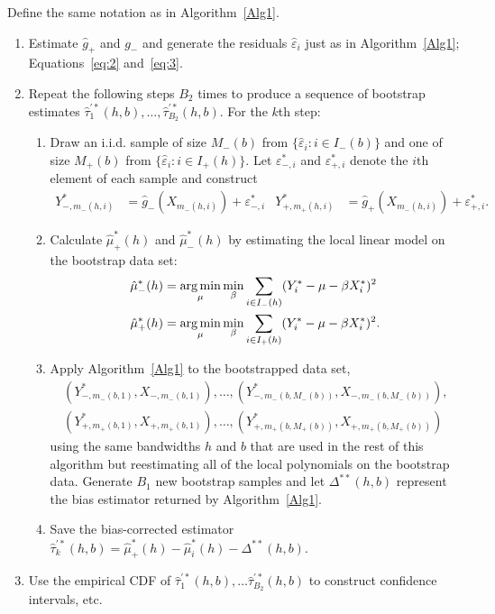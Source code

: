 \documentclass[12pt,fleqn]{article}
\begin{document}
\begin{algorithm}\label{Alg2}
  Define the same notation as in Algorithm~\ref{Alg1}.
  \begin{enumerate}
  \item Estimate $\hat g_+$ and $g_-$ and generate the residuals
    $\hat\varepsilon_i$ just as in Algorithm~\ref{Alg1}; Equations~\eqref{eq:2}
    and~\eqref{eq:3}.
  \item Repeat the following steps $B_{2}$ times to produce a sequence of
    bootstrap estimates
    $\hat\tau_1^{\prime*}(h,b), \dots, \hat\tau_{B_{2}}^{\prime*}(h,b)$. For the
    $k$th step:
    \begin{enumerate}
    \item Draw an i.i.d. sample of size $M_-(b)$ from
      $\{\hat\varepsilon_i : i \in I_-(b)\}$ and one of size $M_+(b)$ from
      $\{\hat\varepsilon_i : i \in I_+(h)\}$. Let $\varepsilon_{-,i}^{*}$ and
      $\varepsilon_{+,i}^{*}$ denote the $i$th element of each sample and
      construct
      \begin{align*}
        Y_{-,m_-(h,i)}^* &= \hat g_-(X_{m_-(h,i)}) + \varepsilon_{-,i}^{*} &
        Y_{+,m_+(h,i)}^* &= \hat g_+(X_{m_-(h,i)}) + \varepsilon_{+,i}^{*}.
      \end{align*}
    \item Calculate $\hat\mu_+^*(h)$ and $\hat\mu_-^*(h)$ by estimating the
      local linear model on the bootstrap data set:
      \begin{align*}
        \hat\mu_-^*(h)
        &= \argmin_{\mu} \min_{\beta} \ssum[-]{i}{h}
          (Y_i^* - \mu - \beta X_i^*)^2 \\
        \hat\mu_+^*(h)
        &= \argmin_{\mu} \min_{\beta} \ssum[+]{i}{h}
          (Y_i^* - \mu - \beta X_i^*)^2.
      \end{align*}
    \item Apply Algorithm~\ref{Alg1} to the bootstrapped data set,
      \begin{multline*}
        (Y_{-,m_-(b,1)}^{*}, X_{-,m_-(b,1)}),\dots,
        (Y_{-,m_-(b,M_-(b))}^{*},X_{-,m_-(b,M_-(b))}), \\
        (Y_{+,m_+(b,1)}^{*}, X_{+,m_+(b,1)}),\dots,
        (Y_{+,m_+(b,M_+(b))}^{*},X_{+,m_+(b,M_+(b))})
      \end{multline*}
      using the same bandwidths $h$ and $b$ that are used in the rest of this
      algorithm but reestimating all of the local polynomials on the bootstrap
      data. Generate $B_1$ new bootstrap samples and let $\Delta^{**}(h,b)$
      represent the bias estimator returned by Algorithm~\ref{Alg1}.
    \item Save the bias-corrected estimator
      $\hat\tau_k^{\prime*}(h,b) = \hat\mu_+^*(h) - \hat\mu_i^*(h)
      - \Delta^{**}(h,b)$.
    \end{enumerate}
  \item Use the empirical CDF of
    $\hat\tau_1^{\prime*}(h,b),\dots \hat\tau_{B_2}^{\prime*}(h,b)$ to
    construct confidence intervals, etc.
  \end{enumerate}
\end{algorithm}
\end{document}
